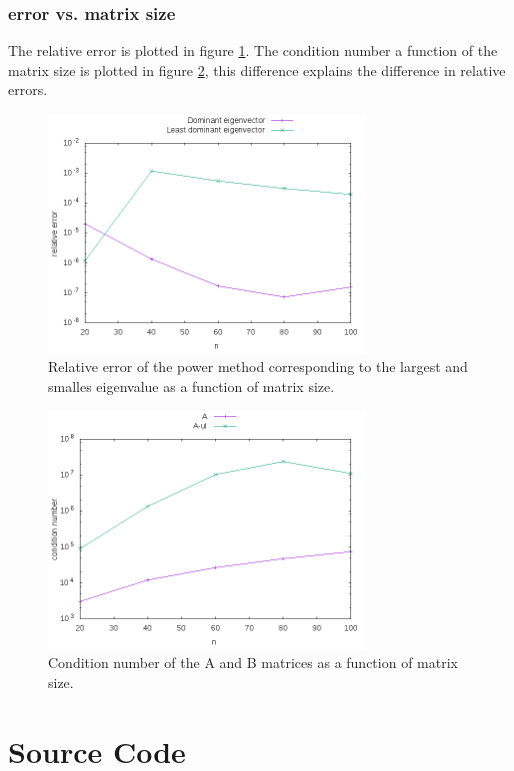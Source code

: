 \subsubsection{error vs. matrix size}
The relative error is plotted in figure \ref{fig:error}. The condition number a function of the matrix size is plotted in figure \ref{fig:cond}, this difference explains the difference in relative errors.
\begin{figure}[h!]
  \centering \includegraphics[width=0.75\textwidth]{plots/error_vs_n.png}
  \caption{Relative error of the power method corresponding to the largest and smalles eigenvalue as a function of matrix size.}
  \label{fig:error}
\end{figure}

\begin{figure}[h!]
  \centering \includegraphics[width=0.75\textwidth]{plots/condition_number.png}
  \caption{Condition number of the A and B matrices as a function of matrix size.}
  \label{fig:cond}
\end{figure}

\newpage
\appendix
\section{Source Code} \label{appendix:source}

